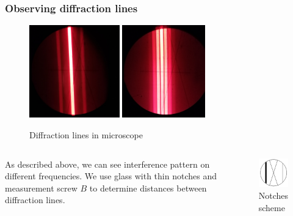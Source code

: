 \documentclass{beamer}
\begin{document}
	\begin{frame}
		\frametitle{Observing diffraction lines}

		\begin{figure}
			\includegraphics[height=4cm]{data/part1/1.jpg}
			\includegraphics[height=4cm]{data/part1/2.jpg}
			\caption{Diffraction lines in microscope}
		\end{figure}
	
		\begin{columns}
			As described above, we can see interference pattern on different frequencies. We use glass with thin notches and measurement screw $B$ to determine distances between diffraction lines.
			\begin{figure}
				\centering
				\includegraphics[width=0.5\linewidth]{res/measurement_glass.png}
				\vspace{-5pt}
				\caption{Notches scheme}
			\end{figure}
		\end{columns}
	
	\end{frame}
\end{document}
